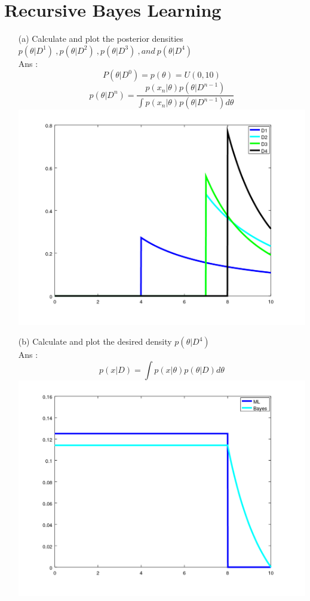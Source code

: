 \documentclass[14pt]{report}
\begin{document}
	\section{Recursive Bayes Learning}
	\begin{enumerate}
		\item [(a)]Calculate and plot the posterior densities  $p(\theta |D^1)\ ,p(\theta |D^2)\ ,p(\theta |D^3)\ ,and\ p(\theta |D^4)\ $\\
		Ans :\\
		\[P(\theta|D^0)=p(\theta)=U(0,10) \]
		\[p(\theta | D^n)=\frac{p(x_n|\theta)p(\theta|D^{n-1})}{\int p(x_n|\theta)p(\theta|D^{n-1})d\theta} \]
			\includegraphics[width=0.5\textheight]{Question2_1.png}
		\item[(b)]Calculate and plot the desired density  $p(\theta |D^4)$ \\
		Ans : \\
		\[p(x|D)=\int p(x|\theta)p(\theta|D)d\theta \]
			\includegraphics[width=0.5\textheight]{Question2_2.png}
	\end{enumerate}
\end{document}
